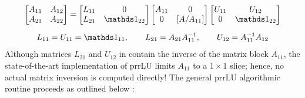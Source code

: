 \begin{gather}
	\label{eq:SchurLU}
	\begin{bmatrix}
	A_{11} & A_{12} \\
	A_{21} & A_{22}
	\end{bmatrix}
	=
	\begin{bmatrix}
	L_{11} & 0 \\
	L_{21} & \identity_{22}
	\end{bmatrix}
	\begin{bmatrix}
	A_{11} & 0 \\
	0 & [A / A_{11}]
	\end{bmatrix}
	\begin{bmatrix}
	U_{11} & U_{12} \\
	0 & \identity_{22}
	\end{bmatrix}\\[6pt]
	\nonumber L_{11} = U_{11} = \identity_{11}, \qquad L_{21} = A_{21}A^{-1}_{11}, \qquad U_{12} = A^{-1}_{11}A_{12}
\end{gather} 
Although matrices $L_{21}$ and $U_{12}$ in  contain the inverse of the matrix block $A_{11}$, the state-of-the-art implementation of prrLU limits $A_{11}$ to a $1\times1$ slice; hence, no actual matrix inversion is computed directly! The general prrLU algorithmic routine proceeds as outlined below \cite{Fernandez2024}:  

